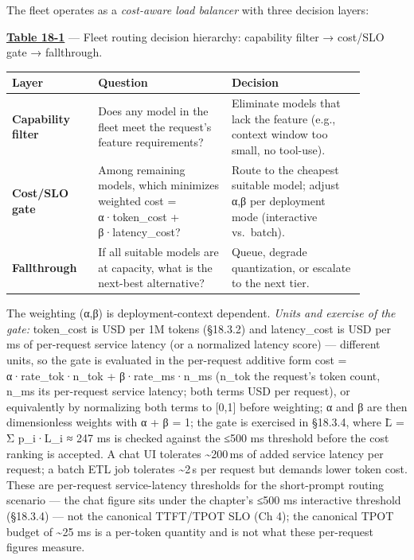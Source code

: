 \label{mental-model}


The fleet operates as a \emph{cost-aware load balancer} with three
decision layers:

\textbf{\hyperref[tab:18.1]{Table 18-1}} --- Fleet routing decision hierarchy: capability
filter → cost/SLO gate → fallthrough.

\nopagebreak[4]
\begin{longtable}[]{@{}
  >{\raggedright\arraybackslash}p{0.2026\linewidth}
  >{\raggedright\arraybackslash}p{0.3377\linewidth}
  >{\raggedright\arraybackslash}p{0.3377\linewidth}@{}}
\toprule\noalign{}
\begin{minipage}[b]{\linewidth}\raggedright
Layer
\end{minipage} & \begin{minipage}[b]{\linewidth}\raggedright
Question
\end{minipage} & \begin{minipage}[b]{\linewidth}\raggedright
Decision
\end{minipage} \\
\midrule\noalign{}
\endhead
\bottomrule\noalign{}
\endlastfoot
\textbf{Capability filter} & Does any model in the fleet meet the
request's feature requirements? & Eliminate models that lack the feature
(e.g., context window too small, no tool-use). \\
\noalign{\label{tab:18.1}}
\textbf{Cost/SLO gate} & Among remaining models, which minimizes
weighted cost = α·token\_cost + β·latency\_cost? & Route to the cheapest
suitable model; adjust α,β per deployment mode (interactive
vs.~batch). \\
\textbf{Fallthrough} & If all suitable models are at capacity, what is
the next-best alternative? & Queue, degrade quantization, or escalate to
the next tier. \\
\end{longtable}

The weighting (α,β) is deployment-context dependent. \emph{Units and
exercise of the gate:} token\_cost is USD per 1M tokens (§18.3.2) and
latency\_cost is USD per ms of per-request service latency (or a
normalized latency score) --- different units, so the gate is evaluated
in the per-request additive form cost = α·rate\_tok·n\_tok +
β·rate\_ms·n\_ms (n\_tok the request's token count, n\_ms its
per-request service latency; both terms USD per request), or
equivalently by normalizing both terms to {[}0,1{]} before weighting; α
and β are then dimensionless weights with α + β = 1; the gate is
exercised in §18.3.4, where L̄ = Σ p\_i·L\_i ≈ 247 ms is checked against
the ≤500 ms threshold before the cost ranking is accepted. A chat UI
tolerates \textasciitilde200\,ms of added service latency per request; a
batch ETL job tolerates \textasciitilde2\,s per request but demands
lower token cost. These are per-request service-latency thresholds for
the short-prompt routing scenario --- the chat figure sits under the
chapter's ≤500 ms interactive threshold (§18.3.4) --- not the canonical
TTFT/TPOT SLO (Ch 4); the canonical TPOT budget of \textasciitilde25 ms
is a per-token quantity and is not what these per-request figures
measure.

